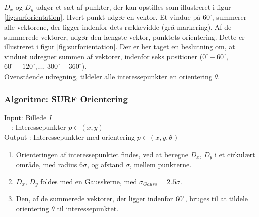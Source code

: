 $D_x$ og $D_y$ udgør et sæt af punkter, der kan opstilles som illustreret i figur \ref{fig:surforientation}. Hvert punkt udgør en vektor. Et vindue på $60^{\circ}$, summerer alle vektorene, der ligger indenfor dets rækkevidde (grå markering). Af de summerede vektorer, udgør den længste vektor, punktets orientering. Dette er illustreret i figur \ref{fig:surforientation}. Der er her taget en beslutning om, at vinduet udregner summen af vektorer, indenfor seks positioner ($0^{\circ}-60^{\circ}$, $60^{\circ}-120^{\circ}$,..., $300^{\circ}-360^{\circ}$).
\\
Ovenstående udregning, tildeler alle interessepunkter en orientering $\theta$.
\subsubsection*{Algoritme: SURF Orientering}
\begin{tabbing}
Input\quad \= : \= Billede $I$\\
$\text{ }$ \> : \>  Interessepunkter $p \in (x, y)$ \\
Output \text{ } \> : \> Interessepunkter med orientering $p \in (x, y, \theta)$
\end{tabbing}
\begin{enumerate}
\item Orienteringen af interessepunktet findes, ved at beregne $D_x$, $D_y$ i et cirkulært område, med radius $6\sigma$, og afstand $\sigma$, mellem punkterne. 
\item $D_x$, $D_y$ foldes med en Gausskerne, med $\sigma_{Gauss} = 2.5\sigma $.
\item Den, af de summerede vektorer, der ligger indenfor $60^{\circ}$, bruges til at tildele orientering $\theta$ til interessepunktet.
\end{enumerate}